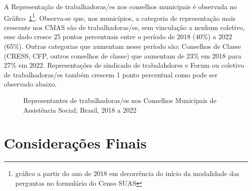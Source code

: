 \documentclass[
  letterpaper,
  DIV=11,
  numbers=noendperiod]{scrreprt}
\begin{document}
A Representação de trabalhadoras/es nos conselhos municipais é observada
no Gráfico~\ref{fig-trab_cmun}\footnote{gráfico a partir do ano de 2018
  em decorrência do início da modalidade das perguntas no formulário do
  Censo SUAS}. Observa-se que, nos municípios, a categoria de
representação mais crescente nos CMAS são de trabalhadoras/es, sem
vinculação a nenhum coletivo, esse dado cresce 25 pontos percentuais
entre o período de 2018 (40\%) a 2022 (65\%). Outras categorias que
aumentam nesse período são: Conselhos de Classe (CRESS, CFP, outros
conselhos de classe) que aumentam de 23\% em 2018 para 27\% em 2022.
Representações de sindicado de trabalahdores e Forum ou coletivo de
trabalhadoras/es também crescem 1 ponto percentual como pode ser
observado abaixo.

\begin{figure}


\caption{\label{fig-trab_cmun}Representantes de trabalhadoras/es nos
Conselhos Municipais de Assistência Social; Brasil, 2018 a 2022}

\end{figure}%

\section{Considerações Finais}\label{considerauxe7uxf5es-finais-4}
\end{document}
